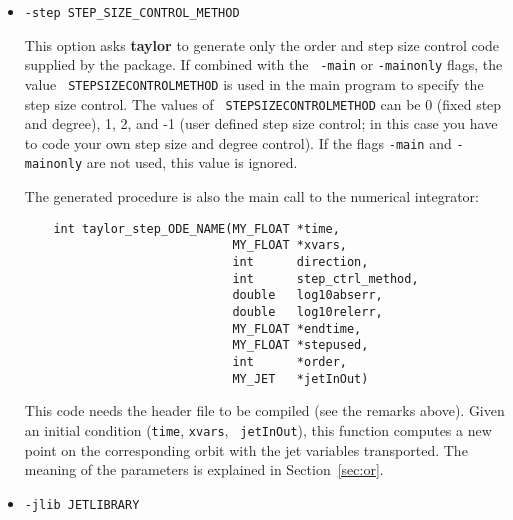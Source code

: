 \documentclass[10pt]{article}
\theoremstyle{remark}
\newcommand{\taylorname}{{\bf taylor}}
\begin{document}
\begin{itemize}
\item{\verb+-step STEP_SIZE_CONTROL_METHOD+

This option asks \taylorname{} to generate only the order and step
size control code supplied by the package. If combined with the {\tt
  -main} or {\tt -mainonly} flags, the value {\tt
  STEPSIZECONTROLMETHOD} is used in
the main program to specify the step size control. The values of {\tt
  STEPSIZECONTROLMETHOD} can be 0
(fixed step and degree), 1, 2, and -1 (user defined step size control;
in this case you have to code your own step size and degree
control). If the flags {\tt -main} and {\tt -mainonly} are
not used, this value is ignored.

The generated procedure is also the main call to the numerical
integrator:
\begin{verbatim}
    int taylor_step_ODE_NAME(MY_FLOAT *time,
                             MY_FLOAT *xvars,
                             int      direction,
                             int      step_ctrl_method,
                             double   log10abserr,
                             double   log10relerr,
                             MY_FLOAT *endtime,
                             MY_FLOAT *stepused,
                             int      *order,
                             MY_JET   *jetInOut)
\end{verbatim}
This code needs the header file to be compiled (see the remarks
above). Given an initial condition ({\tt time}, {\tt xvars}, {\tt
  jetInOut}), this function computes a new point on the corresponding
orbit with the jet variables transported. The meaning of the
parameters is explained in Section~\ref{sec:or}.  }

\item{\verb+-jlib JETLIBRARY+ 

}
\end{itemize}
\end{document}
